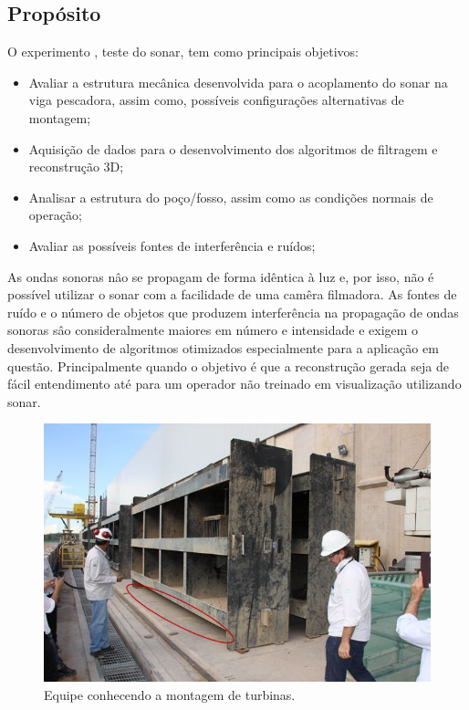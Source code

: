 

\subsection{Propósito}
\label{proposito_sonar}
O experimento %
, teste do sonar, tem como principais objetivos:
 \begin{itemize}
 \item Avaliar a estrutura mecânica desenvolvida para o acoplamento do sonar na
 viga pescadora, assim como, possíveis configurações alternativas de montagem;
 \item Aquisição de dados para o desenvolvimento dos algoritmos de filtragem e
 reconstrução 3D;
 \item Analisar a estrutura do poço/fosso, %
  assim como as condições normais de operação;
 \item Avaliar as possíveis fontes de interferência e ruídos;
 \end{itemize}

As ondas sonoras nâo se propagam de forma idêntica à luz e, por isso, não é
possível utilizar o sonar com a facilidade de uma camêra filmadora. As fontes de
ruído e o número de objetos que produzem interferência na propagação de ondas
sonoras sâo consideralmente maiores em número e intensidade e exigem o
desenvolvimento de algoritmos otimizados especialmente para a aplicação em
questão. Principalmente quando o objetivo é que a reconstrução gerada seja de
fácil entendimento até para um operador não treinado em visualização
utilizando sonar.


\begin{figure}[ht!]
    \centering \includegraphics[width=0.6\columnwidth]{figs/op_rem_3_1}
    \caption{Equipe conhecendo a montagem de turbinas.}
    \label{fig:op_rem_3_1}
\end{figure}

